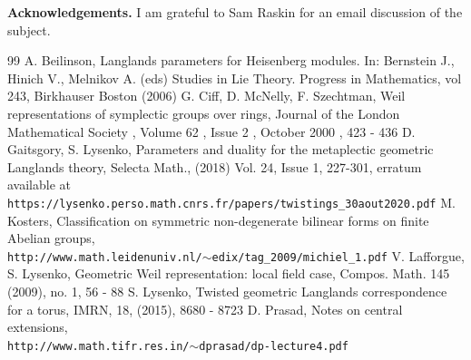 \documentclass[11pt]{amsart}
\theoremstyle{definition}
\theoremstyle{remark}
\newcommand{\<}{\langle}
\renewcommand{\>}{\rangle}
\begin{document}
\medskip\noindent
{\bf Acknowledgements.} I am grateful to Sam Raskin for an email discussion of the subject.
   
\begin{thebibliography}{99}
 A. Beilinson, Langlands parameters for Heisenberg modules. In: Bernstein J., Hinich V., Melnikov A. (eds) Studies in Lie Theory. Progress in Mathematics, vol 243, Birkhauser Boston (2006)
 G. Ciff, D. McNelly, F. Szechtman, Weil representations of symplectic groups over rings, Journal of the London Mathematical Society , Volume 62 , Issue 2 , October 2000 , 423 - 436
 D. Gaitsgory, S. Lysenko, Parameters and duality for the metaplectic geometric Langlands theory, Selecta Math., (2018) Vol. 24, Issue 1, 227-301, erratum available at \\
{\tt https://lysenko.perso.math.cnrs.fr/papers/twistings\_30aout2020.pdf}
 M. Kosters, Classification on symmetric non-degenerate bilinear forms on finite Abelian groups, \\
{\tt http://www.math.leidenuniv.nl/$\sim$edix/tag\_2009/michiel\_1.pdf}
 V. Lafforgue, S. Lysenko,  Geometric Weil representation: local field case, Compos. Math. 145 (2009), no. 1, 56 - 88
 S. Lysenko, Twisted geometric Langlands correspondence for a torus,  IMRN, 18, (2015),  8680 - 8723
 D. Prasad, Notes on central extensions,\\
{\tt http://www.math.tifr.res.in/$\sim$dprasad/dp-lecture4.pdf}
\end{thebibliography} 
\end{document}
